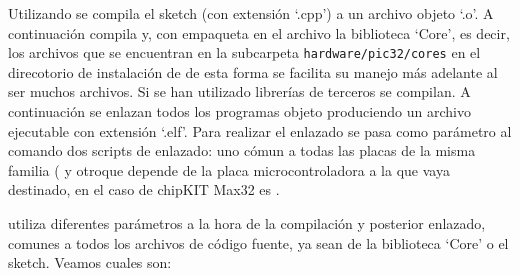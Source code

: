 Utilizando  se compila el sketch (con extensión `.cpp') a un archivo objeto `.o'. A continuación compila y, con  empaqueta en el archivo  la biblioteca `Core', es decir, los archivos que se encuentran en la subcarpeta \verb|hardware/pic32/cores| en el direcotorio de instalación de  de esta forma se facilita su manejo más adelante al ser muchos archivos. Si se han utilizado librerías de terceros se compilan. A continuación se enlazan todos los programas objeto produciendo un archivo ejecutable con extensión `.elf'. Para realizar el enlazado se pasa como parámetro al comando dos scripts de enlazado: uno cómun a todas las placas de la misma familia ( y otroque depende de la placa microcontroladora a la que vaya destinado, en el caso de chipKIT Max32 es .


 utiliza diferentes parámetros a la hora de la compilación y posterior enlazado, comunes a todos los archivos de código fuente, ya sean de la biblioteca `Core' o el sketch. Veamos cuales son:

